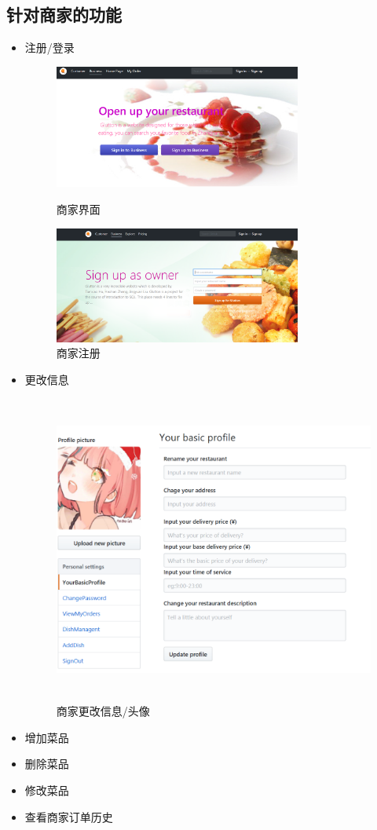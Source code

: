 \documentclass[12pt, oneside,a4paper]{article}
\begin{document}
 \subsection{针对商家的功能}
  \begin{itemize}
  \item 注册/登录
  \begin{figure}[H]
   \begin{minipage}[t]{0.5\linewidth}
    \centering
     \includegraphics[width=3.2in]{restaurant.png}
     \caption{\small{商家界面}}\label{fig:dummy}
   \end{minipage}
   \begin{minipage}[t]{0.5\linewidth}
    \centering
     \includegraphics[width=3.2in]{rsignup.png}
      \caption{\small{商家注册}}\label{fig:dummy}
   \end{minipage}
   \end{figure}
  \item 更改信息
  \begin{figure}[H]
   \centering
     \includegraphics[width=5.00in,height=4.00in]{restaurant-profile.png}
     \caption{\small{商家更改信息/头像}}\label{fig:dummy}
  \end{figure}
  \item 增加菜品
  \item 删除菜品
  \item 修改菜品
  \item 查看商家订单历史
  \end{itemize}
\end{document}
